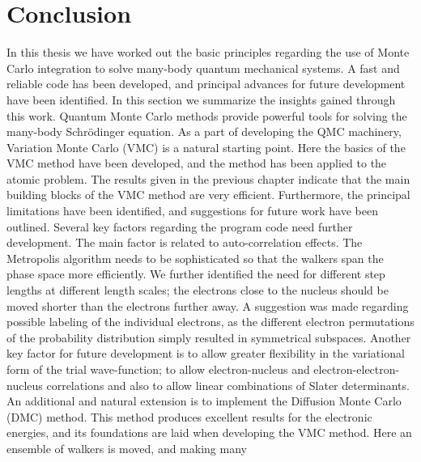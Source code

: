 \chapter{Conclusion}

In this thesis we have worked out the basic principles regarding the
use of Monte Carlo integration to solve many-body quantum mechanical
systems. A fast and reliable code has been developed, and principal
advances for future development have been identified. In this section
we summarize the insights gained through this work.
\newline
%
\newline
Quantum Monte Carlo methods provide powerful tools for solving the
many-body Schr\"o\-dinger equation. As a part of developing the QMC
machinery, Variation Monte Carlo (VMC) is a natural starting point. 
Here the basics of the VMC method have been developed, and the method 
has been applied to the atomic problem. The results given in the
previous chapter indicate that the main building blocks of the VMC
method are very efficient. Furthermore, the principal limitations
have been identified, and suggestions for future work have been
outlined. 
\newline
%
\newline
Several key factors regarding the program code need further
development. The main factor is related to auto-correlation
effects. The Metropolis 
algorithm needs to be sophisticated so that the walkers span the
phase space more efficiently. We further identified the
need for different step lengths at different length scales; the
electrons close to the nucleus should be moved shorter than the
electrons further away. A suggestion was made regarding possible
labeling of the individual electrons, as the different electron
permutations of the probability distribution simply resulted in
symmetrical subspaces.
\newline
%
\newline
Another key factor for future development is to allow greater
flexibility in the variational form of the trial wave-function; to
allow electron-nucleus and electron-electron-nucleus correlations and
also to allow linear combinations of Slater determinants.
\newline
%
\newline
An additional and natural extension is to implement the Diffusion
Monte Carlo (DMC) method. This method produces excellent results for
the electronic energies, and its foundations are laid when developing
the VMC method. Here an ensemble of walkers is moved, and making many
